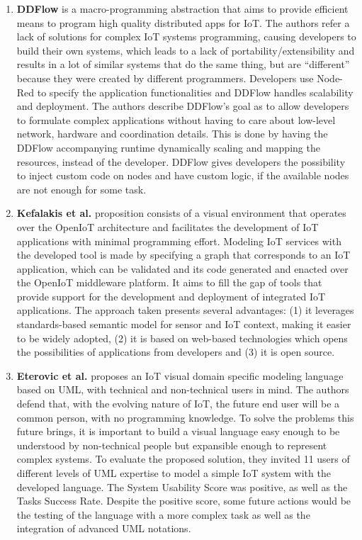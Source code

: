 \begin{enumerate}
    \item \textbf{DDFlow} \cite{ddflow} is a macro-programming abstraction that aims to provide efficient means to program high quality distributed apps for IoT. The authors refer a lack of solutions for complex IoT systems programming, causing developers to build their own systems, which leads to a lack of portability/extensibility and results in a lot of similar systems that do the same thing, but are “different” because they were created by different programmers. Developers use Node-Red to specify the application functionalities and DDFlow handles scalability and deployment. The authors describe DDFlow's goal as to allow developers to formulate complex applications without having to care about low-level network, hardware and coordination details. This is done by having the DDFlow accompanying runtime dynamically scaling and mapping the resources, instead of the developer. DDFlow gives developers the possibility to inject custom code on nodes and have custom logic, if the available nodes are not enough for some task.
    \item \textbf{Kefalakis et al.} \cite{visual_paradigm_iot_solutions_development} proposition consists of a visual environment that operates over the OpenIoT architecture and facilitates the development of IoT applications with minimal programming effort. Modeling IoT services with the developed tool is made by specifying a graph that corresponds to an IoT application, which can be validated and its code generated and enacted over the OpenIoT middleware platform. It aims to fill the gap of tools that provide support for the development and deployment of integrated IoT applications. The approach taken presents several advantages: (1) it leverages standards-based semantic model for sensor and IoT context, making it easier to be widely adopted, (2) it is based on web-based technologies which opens the possibilities of applications from developers and (3) it is open source. 
    \item \textbf{Eterovic et al.} \cite{vpl_uml} proposes an IoT visual domain specific modeling language based on UML, with technical and non-technical users in mind. The authors defend that, with the evolving nature of IoT, the future end user will be a common person, with no programming knowledge. To solve the problems this future brings, it is important to build a visual language easy enough to be understood by non-technical people but expansible enough to represent complex systems. To evaluate the proposed solution, they invited 11 users of different levels of UML expertise to model a simple IoT system with the developed language. The System Usability Score was positive, as well as the Tasks Success Rate. Despite the positive score, some future actions would be the testing of the language with a more complex task as well as the integration of advanced UML notations.

\end{enumerate}
